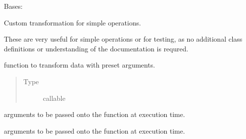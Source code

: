 \documentclass[letterpaper,10pt,english]{sphinxmanual}
\begin{document}
\begin{fulllineitems}
\label{\detokenize{dalio.pipe:dalio.pipe.custom.Custom}}
Bases: {\hyperref[\detokenize{dalio.pipe:dalio.pipe.pipe.Pipe}]{}}

Custom transformation for simple operations.

These are very useful for simple operations or for testing, as no
additional class definitions or understanding of the documentation is
requred.

\begin{fulllineitems}
\label{\detokenize{dalio.pipe:dalio.pipe.custom.Custom.t_func}}
function to transform data with preset arguments.
\begin{quote}\begin{description}
\item[{Type}] \leavevmode
callable

\end{description}\end{quote}

\end{fulllineitems}


\begin{fulllineitems}
\label{\detokenize{dalio.pipe:dalio.pipe.custom.Custom._args}}
arguments to be passed onto the function at execution time.

\end{fulllineitems}


\begin{fulllineitems}
\label{\detokenize{dalio.pipe:dalio.pipe.custom.Custom._kwargs}}
arguments to be passed onto the function at execution
time.


\end{fulllineitems}
\end{fulllineitems}
\end{document}
